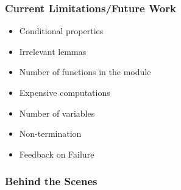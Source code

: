 \documentclass[serif,professionalfont]{beamer}
\begin{document}
\begin{frame}
  \frametitle{Current Limitations/Future Work}

  \begin{itemize}

    \item Conditional properties \pause

    \item Irrelevant lemmas \pause

    \item Number of functions in the module \pause

    \item Expensive computations \pause

    \item Number of variables \pause

    \item Non-termination \pause

    \item Feedback on Failure

  \end{itemize}

\end{frame}










\begin{frame}
  \frametitle{Behind the Scenes}
\end{frame}

%
%
%
%
\end{document}
